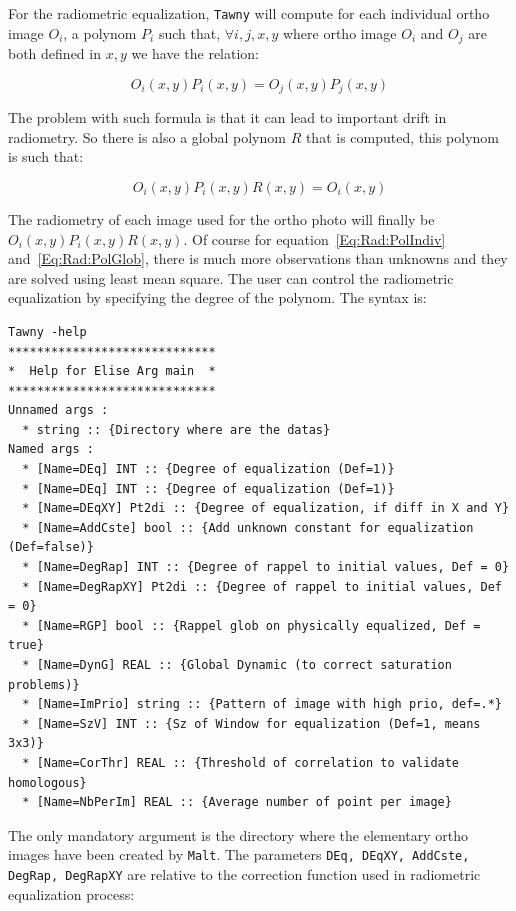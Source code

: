 For the radiometric equalization, {\tt Tawny}  will compute for each
individual ortho image $O_i$, a polynom $P_i$ such that, $\forall i,j,x,y$
where ortho image $O_i$ and $O_j$ are both defined in $x,y$ we have the relation:

\begin{equation}
   O_i(x,y) P_i(x,y) = O_j(x,y) P_j(x,y)
\label{Eq:Rad:PolIndiv}
\end{equation}


The problem with such formula is that it can lead to important drift in radiometry.
So there is also a global polynom $R$ that is computed, this polynom is such that:

\begin{equation}
   O_i(x,y) P_i(x,y) R(x,y) =  O_i(x,y)
\label{Eq:Rad:PolGlob}
\end{equation}

The radiometry of each image used for the ortho photo will finally be $O_i(x,y) P_i(x,y) R(x,y)$.
Of course for equation~\ref{Eq:Rad:PolIndiv} and~\ref{Eq:Rad:PolGlob}, there is
much more observations than unknowns and they are solved using least mean square.
The user can control the radiometric equalization by specifying the
degree of the polynom. The syntax is:




\begin{verbatim}
Tawny -help
*****************************
*  Help for Elise Arg main  *
*****************************
Unnamed args :
  * string :: {Directory where are the datas}
Named args :
  * [Name=DEq] INT :: {Degree of equalization (Def=1)}
  * [Name=DEq] INT :: {Degree of equalization (Def=1)}
  * [Name=DEqXY] Pt2di :: {Degree of equalization, if diff in X and Y}
  * [Name=AddCste] bool :: {Add unknown constant for equalization (Def=false)}
  * [Name=DegRap] INT :: {Degree of rappel to initial values, Def = 0}
  * [Name=DegRapXY] Pt2di :: {Degree of rappel to initial values, Def = 0}
  * [Name=RGP] bool :: {Rappel glob on physically equalized, Def = true}
  * [Name=DynG] REAL :: {Global Dynamic (to correct saturation problems)}
  * [Name=ImPrio] string :: {Pattern of image with high prio, def=.*}
  * [Name=SzV] INT :: {Sz of Window for equalization (Def=1, means 3x3)}
  * [Name=CorThr] REAL :: {Threshold of correlation to validate homologous}
  * [Name=NbPerIm] REAL :: {Average number of point per image}
\end{verbatim}

The only mandatory argument is the directory where the
elementary ortho images have been created by {\tt Malt}. The parameters
{\tt DEq, DEqXY, AddCste, DegRap, DegRapXY} are relative to the correction
function used in radiometric equalization process:

